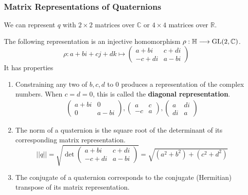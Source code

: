   \subsubsection{Matrix Representations of Quaternions}

    We can represent $q$ with $2 \times 2$ matrices over $\mathbb{C}$ or $4\times 4 $ matrices over $\mathbb{R}$. 

    \begin{theorem}
      The following representation is an injective homomorphism $\rho: \mathbb{H} \longrightarrow \operatorname{GL}(2, \mathbb{C})$. 
      \begin{equation}
        \rho: a + bi + cj + dk \mapsto \begin{pmatrix}
        a+bi & c+ di \\ -c + di & a - bi
        \end{pmatrix}
      \end{equation}
      It has properties
      \begin{enumerate}
        \item Constraining any two of $b, c, d$ to $0$ produces a representation of the complex numbers. When $c = d = 0$, this is called the \textbf{diagonal representation}. 
        \begin{align*}
          \begin{pmatrix}
          a+bi & 0 \\ 0 & a-bi
          \end{pmatrix},  \begin{pmatrix}
          a & c \\ -c & a
          \end{pmatrix},  \begin{pmatrix}
          a & di \\ di & a
          \end{pmatrix}
        \end{align*}
        \item The norm of a quaternion is the square root of the determinant of its corresponding matrix representation. 
          \begin{equation}
            ||q|| = \sqrt{\det \begin{pmatrix}
            a+bi & c+di \\ -c+di & a-bi
            \end{pmatrix}} = \sqrt{(a^2 + b^2) + (c^2 + d^2)}
          \end{equation}
        \item The conjugate of a quaternion corresponds to the conjugate (Hermitian) transpose of its matrix representation. 

\end{enumerate}
\end{theorem}
